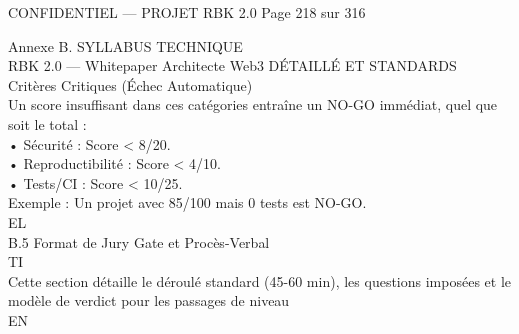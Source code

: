 \documentclass[12pt,landscape,a4paper]{article}
\newenvironment{confidential}
{\begin{tcolorbox}[
    colback=rbkred!5!white,
    colframe=rbkred!75!black,
    title=CONFIDENTIEL,
    fonttitle=\bfseries\color{white},
    coltitle=rbkred!75!black,
    breakable,
    enhanced,
    frame hidden,
    borderline west={2pt}{0pt}{rbkred!75!black}
]}
{\end{tcolorbox}}
\begin{document}
\vspace{0.5em}
\vspace{0.5em}
\begin{confidential}CONFIDENTIEL — PROJET RBK 2.0                                Page 218 sur 316\end{confidential}
Annexe B. SYLLABUS TECHNIQUE\\
RBK 2.0 — Whitepaper Architecte Web3                                                                         DÉTAILLÉ ET STANDARDS\\
\vspace{0.5em}
\vspace{0.5em}
\vspace{0.5em}
Critères Critiques (Échec Automatique)\\
\vspace{0.5em}
Un score insuffisant dans ces catégories entraîne un NO-GO immédiat, quel que soit le total :\\
\vspace{0.5em}
• Sécurité : Score \textless{} 8/20.\\
\vspace{0.5em}
• Reproductibilité : Score \textless{} 4/10.\\
\vspace{0.5em}
• Tests/CI : Score \textless{} 10/25.\\
\vspace{0.5em}
Exemple : Un projet avec 85/100 mais 0 tests est NO-GO.\\
\vspace{0.5em}
\vspace{0.5em}
\vspace{0.5em}
\vspace{0.5em}
EL\\
B.5 Format de Jury Gate et Procès-Verbal\\
\vspace{0.5em}
\vspace{0.5em}
\vspace{0.5em}
\vspace{0.5em}
TI\\
Cette section détaille le déroulé standard (45-60 min), les questions imposées et le modèle de verdict pour les passages de niveau\\
\vspace{0.5em}
\vspace{0.5em}
\vspace{0.5em}
\vspace{0.5em}
EN\\
\end{document}
